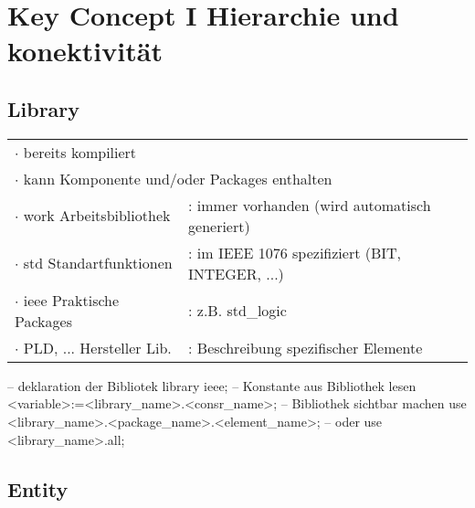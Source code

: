 \section{Key Concept I \tiny Hierarchie und konektivität}

\subsection{Library}

\begin{minipage}{0.519\textwidth}
	\begin{tabular}{l l}
		\multicolumn{2}{l}{$\cdot$ bereits kompiliert} \\
		\multicolumn{2}{l}{$\cdot$ kann Komponente und/oder Packages enthalten} \\
		$\cdot$ work {\tiny Arbeitsbibliothek} 		& : immer vorhanden {\tiny(wird automatisch generiert)}\\
		$\cdot$ std {\tiny Standartfunktionen} 		& : im IEEE 1076 spezifiziert {\tiny(BIT, INTEGER, ...)}\\
		$\cdot$ ieee {\tiny Praktische Packages}	& : z.B. std\_logic \\
		$\cdot$ PLD, ... {\tiny Hersteller Lib.} 	& : Beschreibung spezifischer Elemente \\
\end{tabular}
\end{minipage}
\begin{minipage}{0.48\textwidth}
	\begin{VHDL}
-- deklaration der Bibliotek
library ieee;	
-- Konstante aus Bibliothek lesen
<variable>:=<library_name>.<consr_name>;
-- Bibliothek sichtbar machen
use <library_name>.<package_name>.<element_name>; -- oder
use <library_name>.all;
	\end{VHDL}
\end{minipage}

\newpage
\subsection{Entity}

